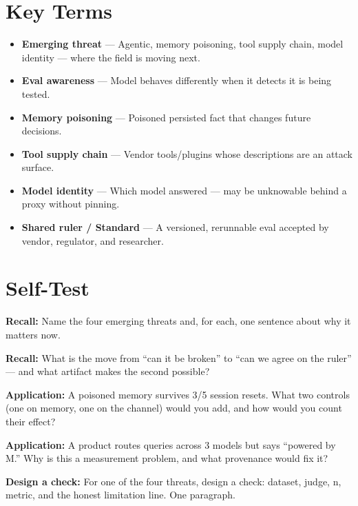 \section{Key Terms}
\begin{itemize}
\item \textbf{Emerging threat} — Agentic, memory poisoning, tool supply chain, model identity — where the field is moving next.
\item \textbf{Eval awareness} — Model behaves differently when it detects it is being tested.
\item \textbf{Memory poisoning} — Poisoned persisted fact that changes future decisions.
\item \textbf{Tool supply chain} — Vendor tools/plugins whose descriptions are an attack surface.
\item \textbf{Model identity} — Which model answered — may be unknowable behind a proxy without pinning.
\item \textbf{Shared ruler / Standard} — A versioned, rerunnable eval accepted by vendor, regulator, and researcher.
\end{itemize}

\section{Self-Test}
\begin{selftest}
\item \textbf{Recall:} Name the four emerging threats and, for each, one sentence about why it matters now.
\item \textbf{Recall:} What is the move from ``can it be broken'' to ``can we agree on the ruler'' — and what artifact makes the second possible?
\item \textbf{Application:} A poisoned memory survives 3/5 session resets. What two controls (one on memory, one on the channel) would you add, and how would you count their effect?
\item \textbf{Application:} A product routes queries across 3 models but says ``powered by M.'' Why is this a measurement problem, and what provenance would fix it?
\item \textbf{Design a check:} For one of the four threats, design a check: dataset, judge, n, metric, and the honest limitation line. One paragraph.
\end{selftest}


